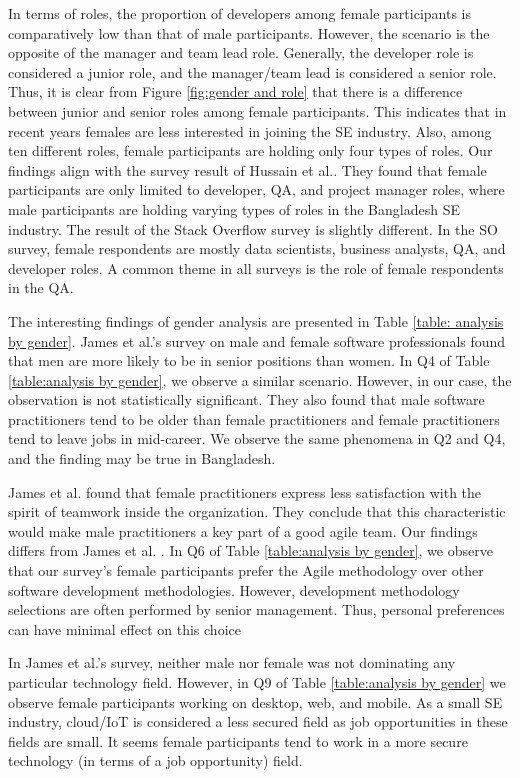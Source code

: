 In terms of roles, the proportion of developers among female participants is comparatively low than that of male participants. However, the scenario is the opposite of the manager and team lead role. Generally, the developer role is considered a junior role, and the manager/team lead is considered a senior role. Thus, it is clear from Figure \ref{fig:gender and role} that there is a difference between junior and senior roles among female participants. This indicates that in recent years females are less interested in joining the SE industry. Also, among ten different roles, female participants are holding only four types of roles. Our findings align with the survey result of Hussain et al.\citep{Hussain2020}. They found that female participants are only limited to developer, QA, and project manager roles, where male participants are holding varying types of roles in the Bangladesh SE industry. The result of the Stack Overflow survey\citep{StackoverflowSurvey2020} is slightly different. In the SO survey, female respondents are mostly data scientists, business analysts, QA, and developer roles. A common theme in all surveys is the role of female respondents in the QA.



The interesting findings of gender analysis are presented in Table \ref{table: analysis by gender}. James et al.'s\citep{James2017} survey on male and female software professionals found that men are more likely to be in senior positions than women. In Q4 of Table \ref{table:analysis by gender}, we observe a similar scenario. However, in our case, the observation is not statistically significant. They also found that male software practitioners tend to be older than female practitioners and female practitioners tend to leave jobs in mid-career. We observe the same phenomena in Q2 and Q4, and the finding may be true in Bangladesh.


James et al.\citep{James2017} found that female practitioners express less satisfaction with the spirit of teamwork inside the organization. They conclude that this characteristic would make male practitioners a key part of a good agile team. Our findings differs from James et al. \citep{James2017}. In Q6 of Table \ref{table:analysis by gender}, we observe that our survey's female participants prefer the Agile methodology over other software development methodologies. However, development methodology selections are often performed by senior management. Thus, personal preferences can have minimal effect on this choice

In James et al.'s survey, neither male nor female was not dominating any particular technology field. However, in Q9 of 
Table \ref{table:analysis by gender} we observe female participants working on desktop, web, and mobile. As a small SE industry, cloud/IoT is considered a less secured field as job opportunities in these fields are small. It seems female participants tend to work in a more secure technology (in terms of a job opportunity) field.